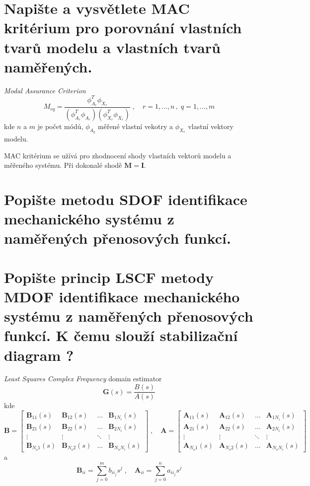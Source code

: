 \documentclass{article}
\begin{document}
	\section{Napište a vysvětlete MAC kritérium pro porovnání vlastních tvarů modelu a vlastních tvarů naměřených. }
	\emph{Modal Assurance Criterion}
	\begin{equation}
	M_{rq} = \frac{\phi_{A_r}^T \phi_{X_r}}{(\phi_{A_r}^T\phi_{A_r})(\phi_{X_r}^T\phi_{X_r})}
	\;,\quad 
	r = 1,\dots,n \,,\; q = 1,\dots,m
	\end{equation}
	kde $n$ a $m$ je počet módů, $\phi_{A_q}$ měřené vlastní vekotry a $\phi_{X_r}$ vlastní vektory modelu.

	MAC kritérium se užívá pro zhodnocení shody vlastních vektorů modelu a měřeného systému. Při dokonalé shodě $\bm{M} = \bm{I}$.

	\section{Popište metodu SDOF identifikace mechanického systému z naměřených přenosových funkcí. }
	\section{Popište princip LSCF metody MDOF identifikace mechanického systému z naměřených přenosových funkcí. K čemu slouží stabilizační diagram ? }
	\emph{Least Squares Complex Frequency} domain estimator
	\begin{equation}
		\bm{G}(s) = \frac{B(s)}{A(s)}
	\end{equation}
	kde
	\begin{equation}
		\bm{B}
		=
		\begin{bmatrix}
			\bm{B}_{11}(s) & \bm{B}_{12}(s) & \dots & \bm{B}_{1N_i}(s) \\
			\bm{B}_{21}(s) & \bm{B}_{22}(s) & \dots & \bm{B}_{2N_i}(s) \\
			\vdots & \vdots & \ddots & \vdots \\
			\bm{B}_{N_o 1}(s) & \bm{B}_{N_o 2}(s) & \dots & \bm{B}_{N_o N_i}(s)
		\end{bmatrix}
		\;,\quad 
		\bm{A}
		=
		\begin{bmatrix}
			\bm{A}_{11}(s) & \bm{A}_{12}(s) & \dots & \bm{A}_{1N_i}(s) \\
			\bm{A}_{21}(s) & \bm{A}_{22}(s) & \dots & \bm{A}_{2N_i}(s) \\
			\vdots & \vdots & \ddots & \vdots \\
			\bm{A}_{N_o 1}(s) & \bm{A}_{N_o 2}(s) & \dots & \bm{A}_{N_o N_i}(s)
		\end{bmatrix}
	\end{equation}
	a
	\begin{equation}
	\bm{B}_{ii} = \sum_{j=0}^m b_{{ii}_j} s^j
	\;,\quad 
	\bm{A}_{ii} = \sum_{j=0}^n a_{{ii}_j} s^j
	\end{equation}
\end{document}

